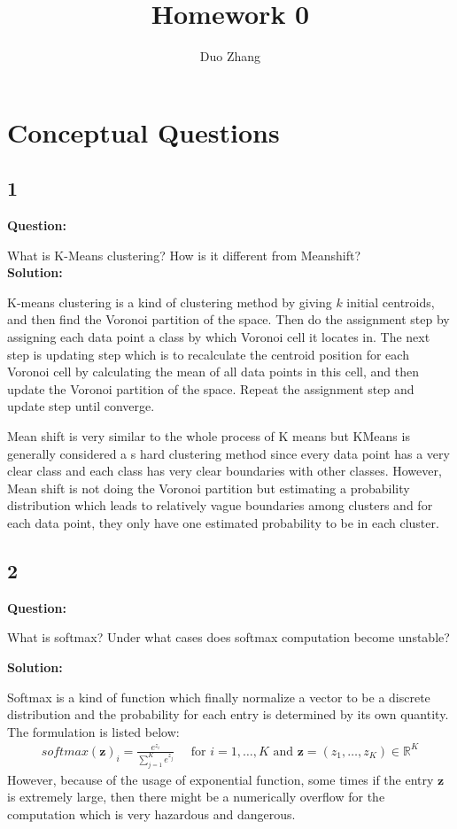 \documentclass[a4paper]{article}
\title{Homework 0}
\author{Duo Zhang}
\begin{document}
\maketitle

\section*{Conceptual Questions}
\subsection*{1}
\textbf{Question:}

What is K-Means clustering? How is it different from Meanshift?\\
\textbf{Solution:}

K-means clustering is a kind of clustering method by giving $k$ initial centroids, and then find the Voronoi partition of the space. Then do the assignment step by assigning each data point a class by which Voronoi cell it locates in. The next step is updating step which is to recalculate the centroid position for each Voronoi cell by calculating the mean of all data points in this cell, and then update the Voronoi partition of the space. Repeat the assignment step and update step until converge.

Mean shift is very similar to the whole process of K means but KMeans is generally considered a s hard clustering method since every data point has a very clear class and each class has very clear boundaries with other classes. However, Mean shift is not doing the Voronoi partition but estimating a probability distribution which leads to relatively vague boundaries among clusters and for each data point, they only have one estimated probability to be in each cluster.
\subsection*{2}
\textbf{Question:}
	
What is softmax? Under what cases does softmax computation become unstable?

\textbf{Solution:}

Softmax is a kind of function which finally normalize a vector to be a discrete distribution and the probability for each entry is determined by its own quantity. The formulation is listed below:
\begin{align*}
    softmax(\mathbf{z})_{i}=\frac{e^{z_{i}}}{\sum_{j=1}^{K} e^{z_{j}}} \quad \text { for } i=1, \ldots, K \text { and } \mathbf{z}=\left(z_{1}, \ldots, z_{K}\right) \in \mathbb{R}^{K}
\end{align*}
However, because of the usage of exponential function, some times if the entry $\textbf{z}$ is extremely large, then there might be a numerically overflow for the computation which is very hazardous and dangerous.
\end{document}
